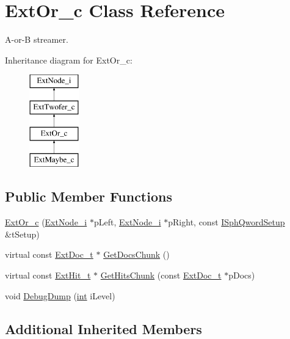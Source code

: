 \hypertarget{classExtOr__c}{\section{Ext\-Or\-\_\-c Class Reference}
\label{classExtOr__c}
}


A-\/or-\/\-B streamer.  


Inheritance diagram for Ext\-Or\-\_\-c\-:\begin{figure}[H]
\begin{center}
\leavevmode
\includegraphics[height=4.000000cm]{classExtOr__c}
\end{center}
\end{figure}
\subsection*{Public Member Functions}
\begin{DoxyCompactItemize}
\item 
\hyperlink{classExtOr__c_a4c97d33250d5b0dde4552120e2d2bfe7}{Ext\-Or\-\_\-c} (\hyperlink{classExtNode__i}{Ext\-Node\-\_\-i} $\ast$p\-Left, \hyperlink{classExtNode__i}{Ext\-Node\-\_\-i} $\ast$p\-Right, const \hyperlink{classISphQwordSetup}{I\-Sph\-Qword\-Setup} \&t\-Setup)
\item 
virtual const \hyperlink{structExtDoc__t}{Ext\-Doc\-\_\-t} $\ast$ \hyperlink{classExtOr__c_ad97e51ec894976af33e6f6518cdaa754}{Get\-Docs\-Chunk} ()
\item 
virtual const \hyperlink{structExtHit__t}{Ext\-Hit\-\_\-t} $\ast$ \hyperlink{classExtOr__c_a13c0a7b5ee7af610c2210b21b9d7ac2b}{Get\-Hits\-Chunk} (const \hyperlink{structExtDoc__t}{Ext\-Doc\-\_\-t} $\ast$p\-Docs)
\item 
void \hyperlink{classExtOr__c_a743fa2f7b557217b18720b4e2071b96e}{Debug\-Dump} (\hyperlink{sphinxexpr_8cpp_a4a26e8f9cb8b736e0c4cbf4d16de985e}{int} i\-Level)
\end{DoxyCompactItemize}
\subsection*{Additional Inherited Members}


